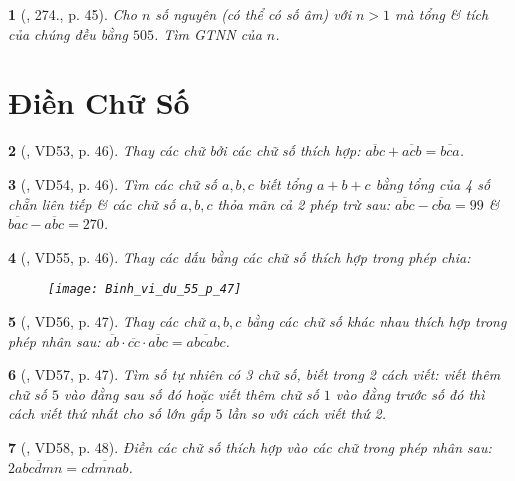 \documentclass{article}
\newtheorem{baitoan}{}
\begin{document}
\begin{baitoan}[\cite{Binh_Toan_6_tap_1}, 274., p. 45]
	Cho $n$ số nguyên (có thể có số âm) với $n > 1$ mà tổng \& tích của chúng đều bằng $505$. Tìm {\rm GTNN} của $n$.
\end{baitoan}


\section{Điền Chữ Số}

\begin{baitoan}[\cite{Binh_Toan_6_tap_1}, VD53, p. 46]
	Thay các chữ bởi các chữ số thích hợp: $\overline{abc} + \overline{acb} = \overline{bca}$.
\end{baitoan}

\begin{baitoan}[\cite{Binh_Toan_6_tap_1}, VD54, p. 46]
	Tìm các chữ số $a,b,c$ biết tổng $a + b + c$ bằng tổng của 4 số chẵn liên tiếp \& các chữ số $a,b,c$ thỏa mãn cả 2 phép trừ sau: $\overline{abc} - \overline{cba} = 99$ \& $\overline{bac} - \overline{abc} = 270$.
\end{baitoan}

\begin{baitoan}[\cite{Binh_Toan_6_tap_1}, VD55, p. 46]
	Thay các dấu {\bf*} bằng các chữ số thích hợp trong phép chia:
	\begin{figure}[H]
		\centering
		\texttt{[image: Binh\_vi\_du\_55\_p\_47]}
	\end{figure}
\end{baitoan}

\begin{baitoan}[\cite{Binh_Toan_6_tap_1}, VD56, p. 47]
	Thay các chữ $a,b,c$ bằng các chữ số khác nhau thích hợp trong phép nhân sau: $\overline{ab}\cdot\overline{cc}\cdot\overline{abc} = \overline{abcabc}$.
\end{baitoan}

\begin{baitoan}[\cite{Binh_Toan_6_tap_1}, VD57, p. 47]
	Tìm số tự nhiên có 3 chữ số, biết trong 2 cách viết: viết thêm chữ số $5$ vào đằng sau số đó hoặc viết thêm chữ số $1$ vào đằng trước số đó thì cách viết thứ nhất cho số lớn gấp $5$ lần so với cách viết thứ 2.
\end{baitoan}

\begin{baitoan}[\cite{Binh_Toan_6_tap_1}, VD58, p. 48]
	Điền các chữ số thích hợp vào các chữ trong phép nhân sau: $2\overline{abcdmn} = \overline{cdmnab}$.
\end{baitoan}
\end{document}

